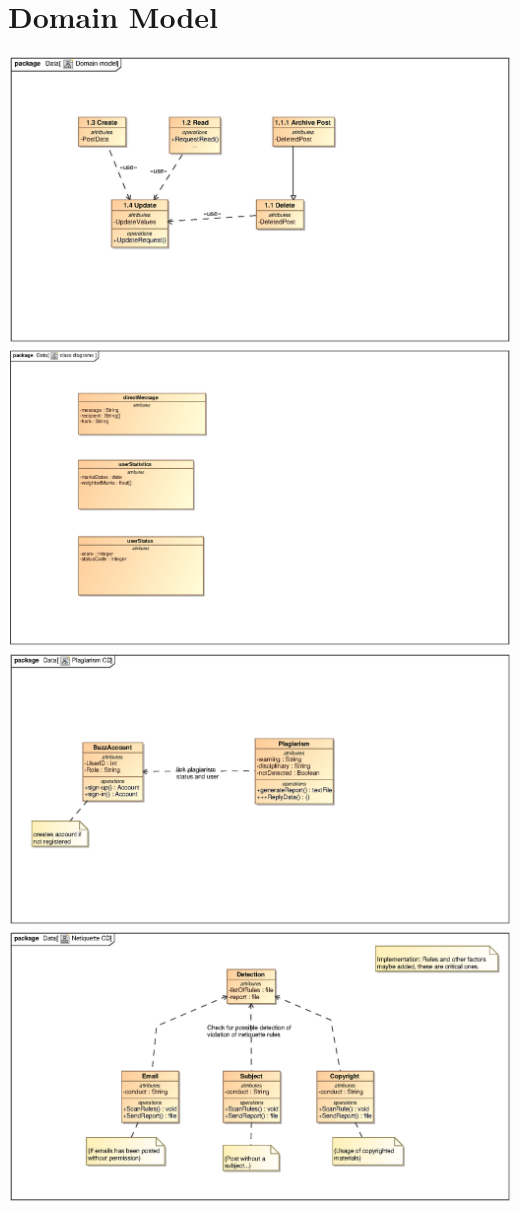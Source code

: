 \documentclass{scrreprt}
\begin{document}
\chapter{Domain Model}   								%
\includegraphics[scale=.9]{CRUDDomainModel.eps}\\
\includegraphics[scale=.9]{seanDM.eps}		
\includegraphics[scale=.9]{HlavuteloPlagiarismCD.eps}\\
\includegraphics[scale=.9]{HlavuteloNetiquetteCD.eps}\\

\end{document}
